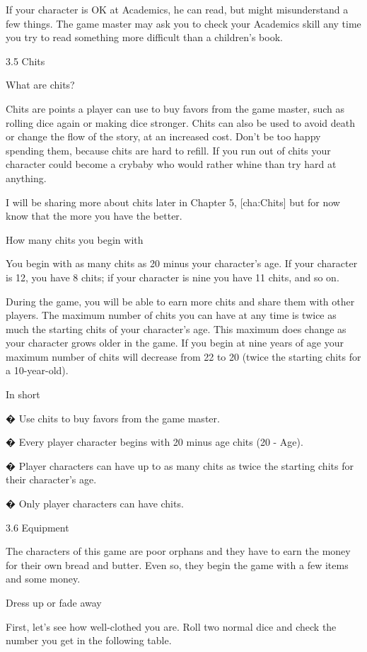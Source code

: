 If your character is OK at Academics, he can read, but might misunderstand a few things. The game master may ask you to check your Academics skill any time you try to read something more difficult than a children's book. 


3.5 Chits


What are chits?


Chits are points a player can use to buy favors from the game master, such as rolling dice again or making dice stronger. Chits can also be used to avoid death or change the flow of the story, at an increased cost. Don't be too happy spending them, because chits are hard to refill. If you run out of chits your character could become a crybaby who would rather whine than try hard at anything. 


I will be sharing more about chits later in Chapter 5, [cha:Chits] but for now know that the more you have the better.


How many chits you begin with


You begin with as many chits as 20 minus your character's age. If your character is 12, you have 8 chits; if your character is nine you have 11 chits, and so on. 


During the game, you will be able to earn more chits and share them with other players. The maximum number of chits you can have at any time is twice as much the starting chits of your character's age. This maximum does change as your character grows older in the game. If you begin at nine years of age your maximum number of chits will decrease from 22 to 20 (twice the starting chits for a 10-year-old).


In short


� Use chits to buy favors from the game master.


� Every player character begins with 20 minus age chits (20 - Age).


� Player characters can have up to as many chits as twice the starting chits for their character's age.


� Only player characters can have chits.


3.6 Equipment


The characters of this game are poor orphans and they have to earn the money for their own bread and butter. Even so, they begin the game with a few items and some money.


Dress up or fade away


First, let's see how well-clothed you are. Roll two normal dice and check the number you get in the following table. 


